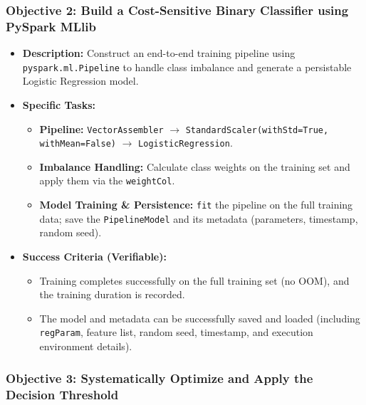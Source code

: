 \documentclass[sigplan,screen]{acmart}
\begin{document}
\subsubsection{Objective 2: Build a Cost-Sensitive Binary Classifier using PySpark MLlib}

\begin{itemize}
\item \textbf{Description:} Construct an end-to-end training pipeline using \texttt{pyspark.ml.Pipeline} to handle class imbalance and generate a persistable Logistic Regression model.
\item \textbf{Specific Tasks:}
\begin{itemize}
\item \textbf{Pipeline:} \texttt{Vector\allowbreak Assembler} $\rightarrow$ \texttt{Standard\allowbreak Scaler\allowbreak (with\allowbreak Std=\allowbreak True, with\allowbreak Mean=\allowbreak False)} $\rightarrow$ \texttt{Logistic\allowbreak Regression}.
\item \textbf{Imbalance Handling:} Calculate class weights on the training set and apply them via the \texttt{weightCol}.
\item \textbf{Model Training \& Persistence:} \texttt{fit} the pipeline on the full training data; save the \texttt{PipelineModel} and its metadata (parameters, timestamp, random seed).
\end{itemize}
\item \textbf{Success Criteria (Verifiable):}
\begin{itemize}
\item Training completes successfully on the full training set (no OOM), and the training duration is recorded.
\item The model and metadata can be successfully saved and loaded (including \texttt{regParam}, feature list, random seed, timestamp, and execution environment details).
\end{itemize}
\end{itemize}

\subsubsection{Objective 3: Systematically Optimize and Apply the Decision Threshold}
\end{document}
